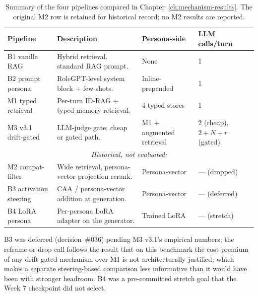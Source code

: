 \begin{table}[H]
  \centering
  \small
  \caption{Summary of the four pipelines compared in Chapter~\ref{ch:mechanism-results}. The original M2 row is retained for historical record; no M2 results are reported.}
  \label{tab:pipelines-summary}
  \begin{tabularx}{\textwidth}{l X l l}
    \toprule
    \textbf{Pipeline} & \textbf{Description} & \textbf{Persona-side} & \textbf{LLM calls/turn} \\
    \midrule
    B1 vanilla RAG & Hybrid retrieval, standard RAG prompt. & None & 1 \\
    B2 prompt persona & RoleGPT-level system block + few-shots. & Inline-prepended & 1 \\
    M1 typed retrieval & Per-turn ID-RAG + typed memory retrieval. & 4 typed stores & 1 \\
    M3 v3.1 drift-gated & LLM-judge gate; cheap or gated path. & M1 + augmented retrieval & 2 (cheap), $2 + N + r$ (gated) \\
    \midrule
    \multicolumn{4}{c}{\textit{Historical, not evaluated:}} \\
    M2 compat-filter & Wide retrieval, persona-vector projection rerank. & Persona-vector & --- (dropped) \\
    B3 activation steering & CAA / persona-vector addition at generation. & Persona-vector & --- (deferred) \\
    B4 LoRA persona & Per-persona LoRA adapter on the generator. & Trained LoRA & --- (stretch) \\
    \bottomrule
  \end{tabularx}
\end{table}

B3 was deferred (decision~\#036) pending M3 v3.1's empirical numbers; the reframe-or-drop call follows the result that on this benchmark the cost premium of any drift-gated mechanism over M1 is not architecturally justified, which makes a separate steering-based comparison less informative than it would have been with stronger headroom. B4 was a pre-committed stretch goal that the Week 7 checkpoint did not select.
